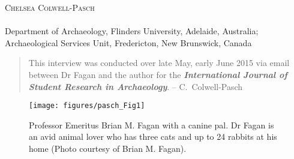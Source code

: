 \openingarticle
\def\ppages{\pagerange{Pasch:firstpage}{Pasch:lastpage}}
\def\shorttitle{Interview: Brian Fagan}
\def\maintitle{Brian Fagan, Ph.D. \textit{Professor Emeritus at the University of California, Santa Barbara}}
\def\shortauthor{Chelsea Colwell-Pasch}
\def\authormail{Chelsea.Colwell-Pasch@gnb.ca}
\def\affiliation{Department of Archaeology, Flinders University, Adelaide, Australia; \\ \noindent Archaeological Services Unit, Fredericton, New Brunswick, Canada}
\begin{center}
	{\Large\scshape\shortauthor}\\[1em]
	\email \\
	\affiliation
\end{center}
\vspace{3em}
\midarticle
\label{Pasch:firstpage}
 
\blockquote{This interview was conducted over late May, early June 2015 via email between Dr Fagan and the author for the \textbf{\textit{International Journal of Student Research in Archaeology}}. -- C.~Colwell-Pasch}	
	
	\begin{figure}[!htb]
		\texttt{[image: figures/pasch\_Fig1]}
		\centering
		\caption{Professor Emeritus Brian M. Fagan with a canine pal. Dr Fagan is an avid animal lover who has three cats and up to 24 rabbits at his home (Photo courtesy of Brian M. Fagan).}
		\label{fig:pasch_Fig1}
	\end{figure}
	
